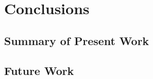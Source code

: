 \chapter{Conclusions}
\label{ch:conclusions}

\section{Summary of Present Work}

\section{Future Work}